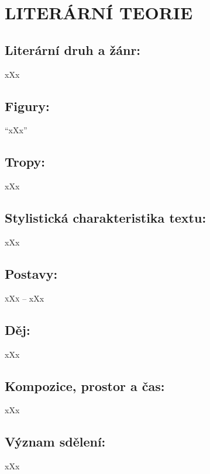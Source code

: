\documentclass{extarticle} %
\begin{document}
\section*{LITERÁRNÍ TEORIE}

\subsection*{Literární druh a žánr:}
\noindent xXx



\subsection*{Figury:}
\noindent 
\enquote{xXx}

\subsection*{Tropy:}
\noindent 
xXx

\subsection*{Stylistická charakteristika textu:}
\noindent 
xXx

\subsection*{Postavy:}
\noindent 
\textsc{xXx --} xXx \\

\subsection*{Děj:}
\noindent 
xXx

\subsection*{Kompozice, prostor a čas:}
\noindent 
xXx

\subsection*{Význam sdělení:}
\noindent 
xXx
\end{document}
